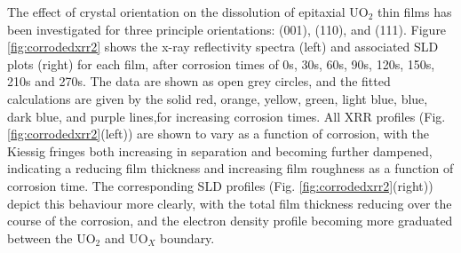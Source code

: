 \documentclass[twocolumn,prl,nobalancelastpage,aps,10pt]{revtex4-1}
\begin{document}
The effect of crystal orientation on the dissolution of epitaxial UO$_2$ thin films has been investigated for three principle orientations: (001), (110), and (111). Figure \ref{fig:corrodedxrr2} shows the x-ray reflectivity spectra (left) and associated SLD plots (right) for each film, after corrosion times of 0s, 30s, 60s, 90s, 120s, 150s, 210s and 270s. The data are shown as open grey circles, and the fitted calculations are given by the solid red, orange, yellow, green, light blue, blue, dark blue, and purple lines,for increasing corrosion times. All XRR profiles (Fig. \ref{fig:corrodedxrr2}(left)) are shown to vary as a function of corrosion, with the Kiessig fringes both increasing in separation and becoming further dampened, indicating a reducing film thickness and increasing film roughness as a function of corrosion time. The corresponding SLD profiles (Fig. \ref{fig:corrodedxrr2}(right)) depict this behaviour more clearly, with the total film thickness reducing over the course of the corrosion, and the electron density profile becoming more graduated between the UO$_2$ and UO$_X$ boundary.


\end{document}
